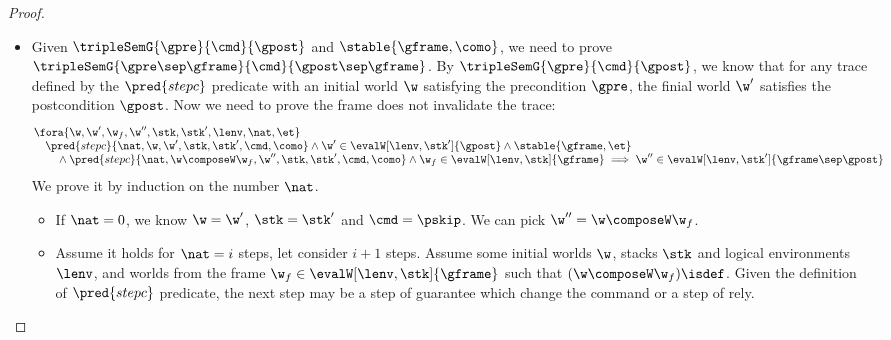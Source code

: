 \begin{proof}
\begin{itemize}
\item {}
Given \( \tripleSemG{\gpre}{\cmd}{\gpost} \) and \( \stable{\gframe, \como}\), we need to prove \( \tripleSemG{\gpre \sep \gframe }{\cmd}{\gpost \sep \gframe } \).
By \( \tripleSemG{\gpre}{\cmd}{\gpost} \), we know that for any trace defined by the \( \pred{stepc} \) predicate with an initial world \( \w \) satisfying the precondition \( \gpre \), the finial world \( \w' \) satisfies the postcondition \( \gpost \). 
Now we need to prove the frame does not invalidate the trace:
\[
\begin{array}[t]{@{}l}
    \fora{ \w,\w', \w_{f}, \w'', \stk, \stk', \lenv, \nat, \et } \\
    \quad \pred{stepc}{\nat, \w, \w', \stk, \stk', \cmd, \como} 
    \land \w' \in \evalW[\lenv, \stk']{\gpost}  
    \land \stable{\gframe, \et} \\
    \qquad {} \land \pred{stepc}{\nat, \w \composeW \w_f, \w'', \stk, \stk', \cmd, \como} 
    \land \w_f \in \evalW[\lenv, \stk]{\gframe} 
    \implies \w'' \in \evalW[\lenv, \stk']{\gframe \sep \gpost}
\end{array}
\]
We prove it by induction on the number \( \nat \).
\begin{itemize}
\item If \( \nat = 0 \),  we know \( \w = \w'\), \( \stk = \stk'\) and \( \cmd = \pskip \).
We can pick \( \w'' = \w \composeW \w_f\).

\item Assume it holds for \( \nat = i \) steps, let consider \( i + 1 \) steps.
Assume some initial worlds \( \w \), stacks \( \stk \) and logical environments \( \lenv \), and worlds from the frame \( \w_f \in \evalW[\lenv, \stk]{\gframe}\) such that \( (\w \composeW \w_f)\isdef \).
Given the definition of \( \pred{stepc}\) predicate, the next step may be a step of guarantee which change the command or a step of rely.

\begin{itemize}


\end{itemize}
\end{itemize}
\end{itemize}
\end{proof}
